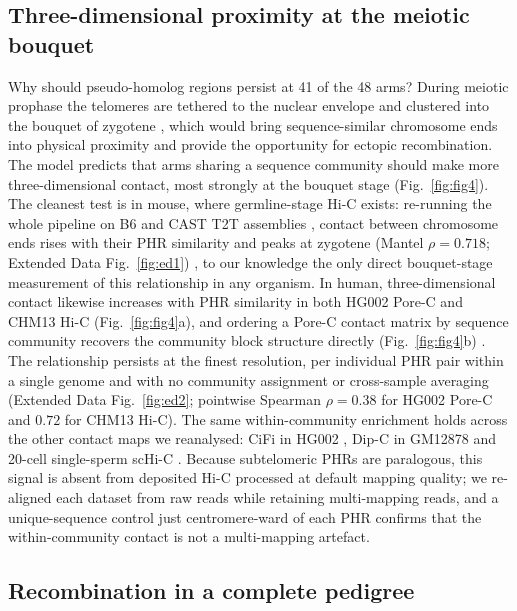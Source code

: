 \documentclass[pdflatex,mathphys]{jnl}
\begin{document}
\subsection*{Three-dimensional proximity at the meiotic bouquet}

Why should pseudo-homolog regions persist at 41 of the 48 arms?
During meiotic prophase the telomeres are tethered to the nuclear envelope and
clustered into the bouquet of zygotene
\cite{bouquet_KotaSUN1MAJIN2020,ZicklerKleckner2015,cech2004chromosomeend}, which
would bring sequence-similar chromosome ends into physical proximity and provide
the opportunity for ectopic recombination.
The model predicts that arms sharing a sequence community should make more
three-dimensional contact, most strongly at the bouquet stage
(Fig.~\ref{fig:fig4}).
The cleanest test is in mouse, where germline-stage Hi-C exists: re-running the
whole pipeline on B6 and CAST T2T assemblies \cite{Francis2025}, contact between
chromosome ends rises with their PHR similarity and peaks at zygotene (Mantel
$\rho = 0.718$; Extended Data Fig.~\ref{fig:ed1}) \cite{Zuo2021}, to our
knowledge the only direct bouquet-stage measurement of this relationship in any
organism.
In human, three-dimensional contact likewise increases with PHR similarity in
both HG002 Pore-C and CHM13 Hi-C (Fig.~\ref{fig:fig4}a), and ordering a Pore-C
contact matrix by sequence community recovers the community block structure
directly (Fig.~\ref{fig:fig4}b) \cite{Ulahannan2019}.
The relationship persists at the finest resolution, per individual PHR pair
within a single genome and with no community assignment or cross-sample
averaging (Extended Data Fig.~\ref{fig:ed2}; pointwise Spearman $\rho = 0.38$
for HG002 Pore-C and $0.72$ for CHM13 Hi-C).
The same within-community enrichment holds across the other contact maps we
reanalysed: CiFi in HG002 \cite{hic3d_cifi2025}, Dip-C in GM12878 \cite{Tan2018}
and 20-cell single-sperm scHi-C \cite{Xu2025}.
Because subtelomeric PHRs are paralogous, this signal is absent from deposited
Hi-C processed at default mapping quality; we re-aligned each dataset from raw
reads while retaining multi-mapping reads, and a unique-sequence control just
centromere-ward of each PHR confirms that the within-community contact is not a
multi-mapping artefact.

\subsection*{Recombination in a complete pedigree}
\end{document}
